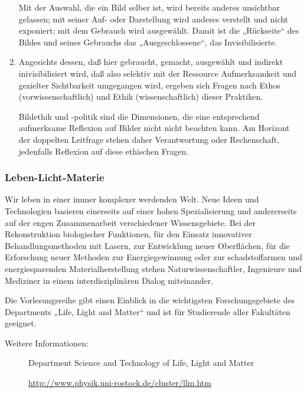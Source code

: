 \documentclass[%
a4paper, %
11pt,               %
leqno,              %
fleqn,              %
]
{scrartcl}
\begin{document}
\begin{enumerate}
    Mit der Auswahl, die ein Bild selber ist, wird bereits anderes unsichtbar
    gelassen; mit seiner Auf- oder Darstellung wird anderes verstellt und nicht
    exponiert; mit dem Gebrauch wird ausgewählt. Damit ist die „Rückseite“ des
    Bildes und seines Gebrauchs das „Ausgeschlossene“, das Invisibilisierte.
  \item Angesichts dessen, daß hier gebraucht, gemacht, ausgewählt und indirekt
    inivisibilisiert wird, daß also selektiv mit der Ressource Aufmerksamkeit
    und gezielter Sichtbarkeit umgegangen wird, ergeben sich Fragen nach Ethos
    (vorwissenschaftlich) und Ethik (wissenschaftlich) dieser Praktiken.

    Bildethik und -politik sind die Dimensionen, die eine entsprechend
    aufmerksame Reflexion auf Bilder nicht nicht beachten kann. Am Horizont der
    doppelten Leitfrage stehen daher Verantwortung oder Rechenschaft, jedenfalls
    Reflexion auf diese ethischen Fragen.
\end{enumerate}


\subsubsection{Leben-Licht-Materie} %
\label{ssub:Leben-Licht-Materie}

Wir leben in einer immer komplexer werdenden Welt. Neue Ideen und Technologien
basieren einerseits auf einer hohen Spezialisierung und andererseits auf der
engen Zusammenarbeit verschiedener Wissensgebiete. Bei der Rekonstruktion
biologischer Funktionen, für den Einsatz innovativer Behandlungsmethoden mit
Lasern, zur Entwicklung neuer Oberflächen, für die Erforschung neuer Methoden
zur Energiegewinnung oder zur schadstoffarmen und energiesparenden
Materialherstellung stehen Naturwissenschaftler, Ingenieure und Mediziner in
einem interdisziplinären Dialog miteinander.

Die Vorlesungsreihe gibt einen Einblick in die wichtigsten Forschungsgebiete des
Departments „Life, Light and Matter“ und ist für Studierende aller Fakultäten
geeignet.

\begin{description}
  \item[Weitere Informationen:] Department Science and Technology of Life, Light
    and Matter

    \url{http://www.physik.uni-rostock.de/cluster/llm.htm}
\end{description}
\end{document}
